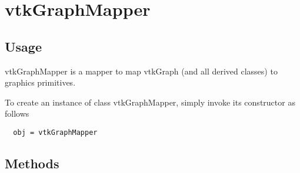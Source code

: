 \section{vtkGraphMapper}

\subsection{Usage}

 vtkGraphMapper is a mapper to map vtkGraph 
 (and all derived classes) to graphics primitives. 

To create an instance of class vtkGraphMapper, simply
invoke its constructor as follows
\begin{verbatim}
  obj = vtkGraphMapper
\end{verbatim}
\subsection{Methods}

